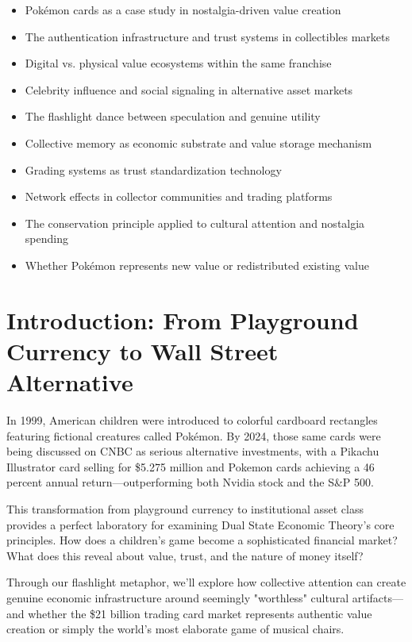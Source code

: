 \documentclass[11pt,oneside]{book}
\begin{document}
\begin{itemize}
\item Pokémon cards as a case study in nostalgia-driven value creation
\item The authentication infrastructure and trust systems in collectibles markets
\item Digital vs. physical value ecosystems within the same franchise
\item Celebrity influence and social signaling in alternative asset markets
\item The flashlight dance between speculation and genuine utility
\item Collective memory as economic substrate and value storage mechanism
\item Grading systems as trust standardization technology
\item Network effects in collector communities and trading platforms
\item The conservation principle applied to cultural attention and nostalgia spending
\item Whether Pokémon represents new value or redistributed existing value
\end{itemize}

\section{Introduction: From Playground Currency to Wall Street Alternative}

In 1999, American children were introduced to colorful cardboard rectangles featuring fictional creatures called Pokémon. By 2024, those same cards were being discussed on CNBC as serious alternative investments, with a Pikachu Illustrator card selling for \$5.275 million and Pokemon cards achieving a 46 percent annual return—outperforming both Nvidia stock and the S\&P 500.

This transformation from playground currency to institutional asset class provides a perfect laboratory for examining Dual State Economic Theory's core principles. How does a children's game become a sophisticated financial market? What does this reveal about value, trust, and the nature of money itself?

Through our flashlight metaphor, we'll explore how collective attention can create genuine economic infrastructure around seemingly "worthless" cultural artifacts—and whether the \$21 billion trading card market represents authentic value creation or simply the world's most elaborate game of musical chairs.
\end{document}
